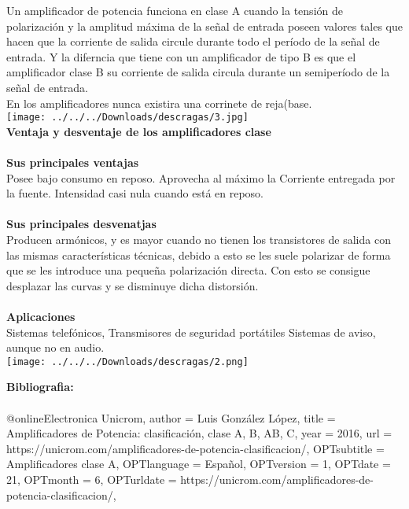 \documentclass[12pt]{report}
\begin{document}
{\Large Un amplificador de potencia funciona en clase A cuando la tensión de polarización y la amplitud máxima de la señal de entrada poseen valores tales que hacen que la corriente de salida circule durante todo el período de la señal de entrada.  Y la diferncia que tiene con un amplificador de tipo B es que el amplificador clase B su corriente de salida circula durante un semiperíodo de la señal de entrada.\\ En los amplificadores nunca existira una corrinete de reja(base.}\\
\texttt{[image: ../../../Downloads/descragas/3.jpg]} \\

{\huge \textbf{Ventaja y desventaje de los amplificadores clase }\\}\\


{\Large \textbf{Sus principales ventajas}\\Posee bajo consumo en reposo.
Aprovecha al máximo la Corriente entregada por la fuente.
Intensidad casi nula cuando está en reposo.\\\\ \textbf{Sus principales desvenatjas}\\Producen armónicos, y es mayor cuando no tienen los transistores de salida con las mismas características técnicas, debido a esto se les suele polarizar de forma que se les introduce una pequeña polarización directa. Con esto se consigue desplazar las curvas y se disminuye dicha distorsión.\\\\ \textbf{Aplicaciones}\\ Sistemas telefónicos,
Transmisores de seguridad portátiles
Sistemas de aviso, aunque no en audio.}\\
\texttt{[image: ../../../Downloads/descragas/2.png]} 

\newpage
{\huge \textbf{Bibliografia:}\\}\\
{\large
@online{Electronica Unicrom,
author = {Luis González López},
title = {Amplificadores de Potencia: clasificación, clase A, B, AB, C},
year = {2016},
url = {https://unicrom.com/amplificadores-de-potencia-clasificacion/},
OPTsubtitle = {Amplificadores clase A},
OPTlanguage = {Español},
OPTversion = {1},
OPTdate = {21},
OPTmonth = {6},
OPTurldate = {https://unicrom.com/amplificadores-de-potencia-clasificacion/},
}
}
\end{document}
